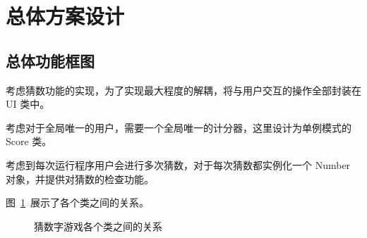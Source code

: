 \section{总体方案设计}

\subsection{总体功能框图}

考虑猜数功能的实现，为了实现最大程度的解耦，将与用户交互的操作全部封装在 UI 类中。

考虑对于全局唯一的用户，需要一个全局唯一的计分器，这里设计为单例模式的 Score 类。

考虑到每次运行程序用户会进行多次猜数，对于每次猜数都实例化一个 Number 对象，并提供对猜数的检查功能。

图~\ref{classes}~展示了各个类之间的关系。

\begin{figure}[htp]
  \pictext\small
{}
  \caption{\label{classes}猜数字游戏各个类之间的关系}
\end{figure}
